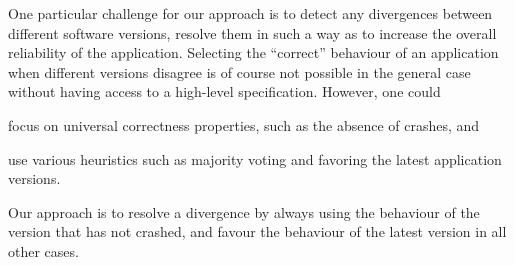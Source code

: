 One particular challenge for our approach is to detect any divergences between
different software versions, resolve them in such a way as to increase the
overall reliability of the application.%
Selecting the ``correct'' behaviour of an application when different versions
disagree is of course not possible in the general case without having access to
a high-level specification.  However, one could%
\begin{inparaenum}[(1)]
\item focus on universal correctness properties, such as the absence of
  crashes, and
\item use various heuristics such as majority voting and favoring the latest
  application versions.
\end{inparaenum}
Our approach is to resolve a divergence by always using the behaviour of the
version that has not crashed, and favour the behaviour of the latest version in
all other cases. %







